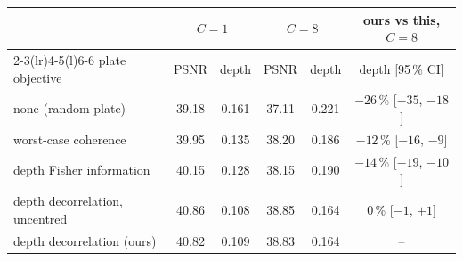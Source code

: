 \begin{tabular}{@{}l cc cc c@{}}\toprule
 & \multicolumn{2}{c}{$C=1$} & \multicolumn{2}{c}{$C=8$} & ours vs this, $C=8$\\
\cmidrule(lr){2-3}\cmidrule(lr){4-5}\cmidrule(l){6-6}
plate objective & PSNR & depth & PSNR & depth & depth [95\,\% CI]\\\midrule
none (random plate) & 39.18 & 0.161 & 37.11 & 0.221 & $-26$\,\% [$-35$, $-18$]\\
worst-case coherence & 39.95 & 0.135 & 38.20 & 0.186 & $-12$\,\% [$-16$, $-9$]\\
depth Fisher information & 40.15 & 0.128 & 38.15 & 0.190 & $-14$\,\% [$-19$, $-10$]\\
depth decorrelation, uncentred & 40.86 & 0.108 & 38.85 & 0.164 & $0$\,\% [$-1$, $+1$]\\
depth decorrelation (ours) & 40.82 & 0.109 & 38.83 & 0.164 & --\\
\bottomrule\end{tabular}
